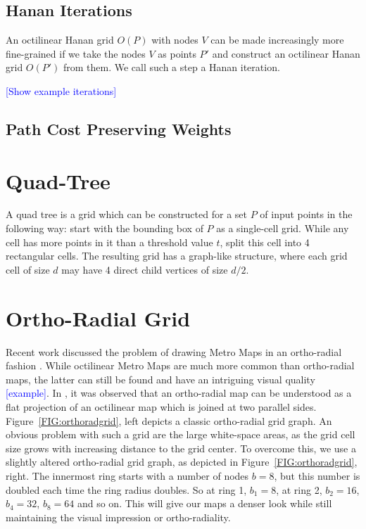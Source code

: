 \documentclass[sigconf]{acmart}
\newcommand\TODO[1]{\textcolor{blue}{\small [#1]}}
\begin{document}
\subsection{Hanan Iterations}

An octilinear Hanan grid $O(P)$ with nodes $V$ can be made increasingly more fine-grained if we take the nodes $V$ as points $P'$ and construct an octilinear Hanan grid $O(P')$ from them.
We call such a step a Hanan iteration.

\TODO{Show example iterations}

\subsection{Path Cost Preserving Weights}

\section{Quad-Tree}

A quad tree is a grid which can be constructed for a set $P$ of input points in the following way: start with the bounding box of $P$ as a single-cell grid.
While any cell has more points in it than a threshold value $t$, split this cell into 4 rectangular cells.
The resulting grid has a graph-like structure, where each grid cell of size $d$ may have 4 direct child vertices of size $d / 2$.

\section{Ortho-Radial Grid}

Recent work discussed the problem of drawing Metro Maps in an ortho-radial fashion \cite{TODO}.
While octilinear Metro Maps are much more common than ortho-radial maps, the latter can still be found and have an intriguing visual quality \TODO{example}.
In \cite{TODO}, it was observed that an ortho-radial map can be understood as a flat projection of an octilinear map which is joined at two parallel sides.
Figure~\ref{FIG:orthoradgrid}, left depicts a classic ortho-radial grid graph.
An obvious problem with such a grid are the large white-space areas, as the grid cell size grows with increasing distance to the grid center.
To overcome this, we use a slightly altered ortho-radial grid graph, as depicted in Figure~\ref{FIG:orthoradgrid}, right.
The innermost ring starts with a number of nodes $b = 8$, but this number is doubled each time the ring radius doubles.
So at ring 1, $b_1 = 8$, at ring 2, $b_2 = 16$, $b_4 = 32$, $b_8 = 64$ and so on.
This will give our maps a denser look while still maintaining the visual impression or ortho-radiality.
\end{document}
